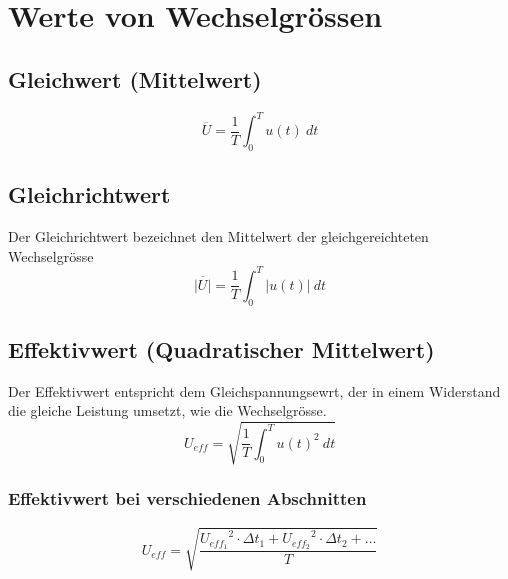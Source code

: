 



\section{Werte von Wechselgrössen}

\subsection{Gleichwert (Mittelwert)}
\[ \overline{U} = \frac{1}{T} \int_0^T u(t) ~ dt \]

\subsection{Gleichrichtwert}
Der Gleichrichtwert bezeichnet den Mittelwert der gleichgereichteten 
Wechselgrösse
\[ \overline{|U|} = \frac{1}{T} \int_0^T |u(t)| ~ dt \]

\subsection{Effektivwert (Quadratischer Mittelwert)}
Der Effektivwert entspricht dem Gleichspannungsewrt, der in einem Widerstand 
die gleiche Leistung umsetzt, wie die Wechselgrösse. 
\[ U_{eff} = \sqrt{\frac{1}{T} \int_0^T u(t)^2 ~ dt} \]

\subsubsection{Effektivwert bei verschiedenen Abschnitten}
\[ U_{eff} = \sqrt{\frac{{U_{eff_1}}^2 \cdot \Delta t_1 
+ {U_{eff_2}}^2 \cdot \Delta t_2 + \dots}{T}} \]

